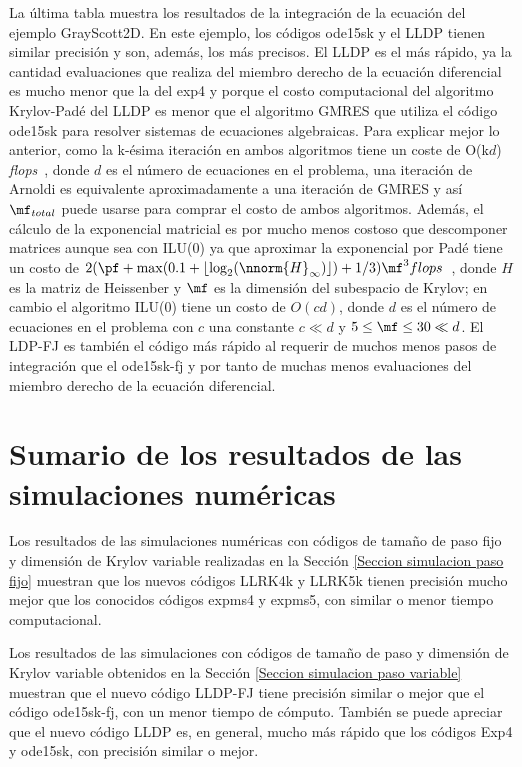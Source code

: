 La última tabla muestra los resultados de la integración de la ecuación del ejemplo GrayScott2D. En este ejemplo, los códigos ode15sk y el LLDP tienen similar
 precisión y son, además, los más precisos. El LLDP es el más rápido, ya la cantidad evaluaciones que realiza del miembro derecho de la ecuación diferencial es mucho
  menor que la del exp4 y porque el costo computacional del algoritmo Krylov-Padé del LLDP es menor que el algoritmo  GMRES que utiliza el código ode15sk 
  para resolver sistemas de ecuaciones algebraicas. Para explicar mejor lo anterior, como la k-ésima iteración en ambos algoritmos tiene un coste de O(k$d$)
  \emph{flops}~\cite{matrixexp}, donde $d$ es el número de ecuaciones en el problema, una iteración de Arnoldi es equivalente aproximadamente a una iteración
  de GMRES y así $\mf_{total}$ puede usarse para comprar el costo de ambos algoritmos. Además, el cálculo de la exponencial matricial es por mucho menos 
  costoso que descomponer matrices aunque sea con ILU(0) ya que aproxi\-mar la exponencial por Padé tiene un costo de 
  $2( \pf+ \max( 0\mathord{.}1+\lfloor\log_2(\nnorm{H}_\infty)\rfloor ) + 1/3 )\mf^3 flops$~\cite{matrixexp}, donde $H$ es la matriz de Heissenber y 
  $\mf$ es la dimensión del subespacio de Krylov; en cambio el algoritmo ILU(0)\cite{saad2003iterative,hysom2002level} tiene un costo de $O(cd)$,
  donde $d$ es el número de ecuaciones en el problema con $c$ una constante $c\ll d$ y $5\leq\mf\leq30 \ll d$. El LDP-FJ es también el código más rápido 
al requerir de muchos menos pasos de integración que el ode15sk-fj y por tanto de muchas menos evaluaciones del miembro derecho de la ecuación diferencial.

\section{Sumario de los resultados de las simulaciones numéricas}

Los resultados de las simulaciones numéricas con códigos de tamaño de paso fijo y dimensión de Krylov variable realizadas en la Sección  \ref{Seccion simulacion paso fijo} muestran que los nuevos códigos LLRK4k y LLRK5k tienen precisión mucho mejor que los conocidos c\'odigos expms4 y expms5, con similar o menor tiempo computacional.

Los resultados de las simulaciones con códigos de tamaño de paso y dimensión de Krylov variable obtenidos en la Sección \ref{Seccion simulacion paso variable} muestran que el nuevo c\'odigo LLDP-FJ tiene precisión similar o mejor que el c\'odigo ode15sk-fj, con un menor tiempo de cómputo. También se puede apreciar que el nuevo c\'odigo LLDP es, en general, mucho m\'as r\'apido que los códigos Exp4 y ode15sk, con precisi\'on similar o mejor.
		
